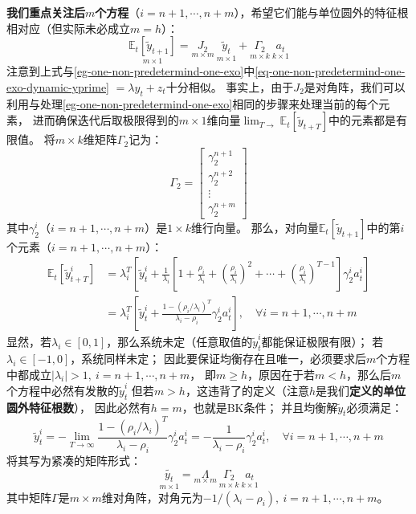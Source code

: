 \textbf{我们重点关注后$m$个方程}（$i=n+1,\cdots,n+m$），希望它们能与单位圆外的特征根相对应（但实际未必成立$m=h$）：
\begin{equation*}
    \underset{m\times 1}{\mathbb{E}_t\left[\tilde{y}_{t+1}\right]} = 
        \underset{m\times m}{J_2} ~ \underset{m\times 1}{\tilde{y}_t} + 
            \underset{m\times k}{\Gamma_2} ~ \underset{k\times 1}{a_t}
\end{equation*}
注意到上式与\cref{eg-one-non-predetermind-one-exo}中\cref{eq-one-non-predetermind-one-exo-dynamic-yprime}
$=\lambda y_t + z_t$十分相似。
事实上，由于$J_2$是对角阵，我们可以利用与处理\cref{eg-one-non-predetermind-one-exo}相同的步骤来处理当前的每个元素，
进而确保迭代后取极限得到的$m\times 1$维向量$\lim_{T\rightarrow}\mathbb{E}_t\left[\tilde{y}_{t+T}\right]$中的元素都是有限值。
将$m\times k$维矩阵$\Gamma_2$记为：
\[
    \Gamma_2 = 
    \begin{bmatrix}
        \gamma_2^{n+1}  \\
        \gamma_2^{n+2}  \\
        \vdots \\
        \gamma_2^{n+m}
    \end{bmatrix}
\]
其中$\gamma_2^i$（$i=n+1,\cdots,n+m$）是$1\times k$维行向量。
那么，对向量$\mathbb{E}_t\left[\tilde{y}_{t+1}\right]$中的第$i$个元素（$i=n+1,\cdots,n+m$）：
\begin{equation*}
    \begin{aligned}
        \mathbb{E}_t\left[\tilde{y}_{t+T}^i\right] &= 
            \lambda_i^T\left[\tilde{y}_t^i + \frac{1}{\lambda_i}\left[1 + \frac{\rho_i}{\lambda_i} + 
            \left(\frac{\rho_i}{\lambda_i}\right)^2 + \cdots + 
            \left(\frac{\rho_i}{\lambda_i}\right)^{T-1}\right]\gamma_2^i a_t^i\right] \\
        &= \lambda_i^T\left[\tilde{y}_t^i + \frac{1-\left(\rho_i / \lambda_i\right)^T}{\lambda_i-\rho_i}
                \gamma_2^i a_t^i\right], \quad \forall i = n+1,\cdots,n+m
    \end{aligned}
\end{equation*}
显然，若$\lambda_i \in [0,1]$，那么系统未定（任意取值的$\tilde{y}_t^i$都能保证极限有限）；
若$\lambda_i \in [-1,0]$，系统同样未定；
因此要保证均衡存在且唯一，必须要求后$m$个方程中都成立$\left|\lambda_i\right| > 1,~i=n+1,\cdots,n+m$，
即$m\geq h$，原因在于若$m<h$，那么后$m$个方程中必然有发散的$\tilde{y}_t^i$
但若$m>h$，这违背了的定义（注意$h$是我们\textbf{定义的单位圆外特征根数}），
因此必然有$h=m$，也就是BK条件；
并且均衡解$\tilde{y}_t$必须满足：
\begin{equation*}
    \tilde{y}_t^i = -\lim_{T\rightarrow \infty}\frac{1-\left(\rho_i/\lambda_i\right)^T}{\lambda_i-\rho_i}\gamma_2^i a_t^i
        = -\frac{1}{\lambda_i-\rho_i}\gamma_2^i a_t^i, \quad \forall i = n+1,\cdots,n+m
\end{equation*}
将其写为紧凑的矩阵形式：
\begin{equation*}
    \underset{m\times 1}{\tilde{y_t}} = \underset{m\times m}{\Lambda} ~ \underset{m\times k}{\Gamma_2} ~ 
        \underset{k\times 1}{a_t}
\end{equation*}
其中矩阵$\Gamma$是$m\times m$维对角阵，对角元为$-1/(\lambda_i - \rho_i), ~i=n+1,\cdots,n+m$。

